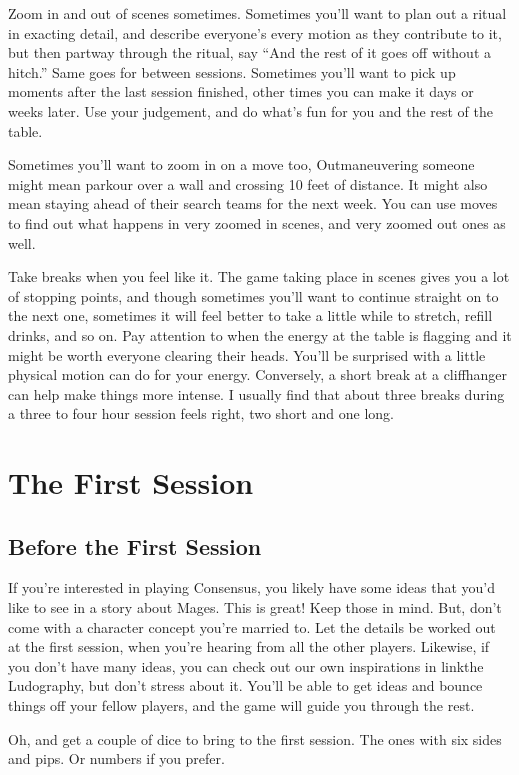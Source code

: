 \documentclass[
  oneside,
  statementpaper,
  9pt]{memoir}
\begin{document}
Zoom in and out of scenes sometimes. Sometimes you'll want to plan out a
ritual in exacting detail, and describe everyone's every motion as they
contribute to it, but then partway through the ritual, say ``And the
rest of it goes off without a hitch.'' Same goes for between sessions.
Sometimes you'll want to pick up moments after the last session
finished, other times you can make it days or weeks later. Use your
judgement, and do what's fun for you and the rest of the table.

Sometimes you'll want to zoom in on a move too, Outmaneuvering someone
might mean parkour over a wall and crossing 10 feet of distance. It
might also mean staying ahead of their search teams for the next week.
You can use moves to find out what happens in very zoomed in scenes, and
very zoomed out ones as well.

Take breaks when you feel like it. The game taking place in scenes gives
you a lot of stopping points, and though sometimes you'll want to
continue straight on to the next one, sometimes it will feel better to
take a little while to stretch, refill drinks, and so on. Pay attention
to when the energy at the table is flagging and it might be worth
everyone clearing their heads. You'll be surprised with a little
physical motion can do for your energy. Conversely, a short break at a
cliffhanger can help make things more intense. I usually find that about
three breaks during a three to four hour session feels right, two short
and one long.

\newpage

\hypertarget{the-first-session}{%
\chapter{The First Session}\label{the-first-session}}

\hypertarget{before-the-first-session}{%
\section{Before the First Session}\label{before-the-first-session}}

\begin{Player}

If you're interested in playing Consensus, you likely have some ideas that you'd like to see in a story about Mages. This is great! Keep those in mind. But, don't come with a character concept you're married to. Let the details be worked out at the first session, when you're hearing from all the other players. Likewise, if you don't have many ideas, you can check out our own inspirations in {{linkthe Ludography}}, but don't stress about it. You'll be able to get ideas and bounce things off your fellow players, and the game will guide you through the rest.

Oh, and get a couple of dice to bring to the first session. The ones with six sides and pips. Or numbers if you prefer.

\end{Player}
\end{document}
